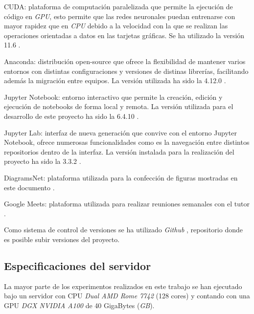             \begin{description}

                \item CUDA: plataforma de computación paralelizada que permite la ejecución de código en \textit{GPU}, esto permite que las redes neuronales puedan entrenarse con mayor rapidez que en \textit{CPU} debido a la velocidad con la que se realizan las operaciones orientadas a datos en las tarjetas gráficas. Se ha utilizado la versión 11.6 \cite{CUDA}.

                \item Anaconda: distribución open-source que ofrece la flexibilidad de mantener varios entornos con distintas configuraciones y versiones de distinas librerías, facilitando además la migración entre equipos. La versión utilizada ha sido la 4.12.0 \cite{Anaconda}.

                \item Jupyter Notebook: entorno interactivo que permite la creación, edición y ejecución de notebooks de forma local y remota. La versión utilizada para el desarrollo de este proyecto ha sido la 6.4.10 \cite{JupyterNotebook}.

                \item Jupyter Lab: interfaz de nueva generación que convive con el entorno Jupyter Notebook, ofrece numerosas funcionalidades como es la navegación entre distintos repositorios dentro de la interfaz. La versión instalada para la realización del proyecto ha sido la 3.3.2 \cite{JupyterLab}.

                \item DiagramsNet: plataforma utilizada para la confección de figuras mostradas en este documento \cite{DiagramsNet}. 

                \item Google Meets: plataforma utilizada para realizar reuniones semanales con el tutor \cite{GoogleMeet}.

            \end{description}

            Como sistema de control de versiones se ha utilizado \textit{Github} \cite{Github}, repositorio donde es posible subir versiones del proyecto.

        \subsection{Especificaciones del servidor}
            La mayor parte de los experimentos realizados en este trabajo se han ejecutado bajo un servidor con CPU \textit{Dual AMD Rome 7742} (128 cores) y contando con una GPU \textit{DGX NVIDIA A100} de  40 GigaBytes (\textit{GB}).
            